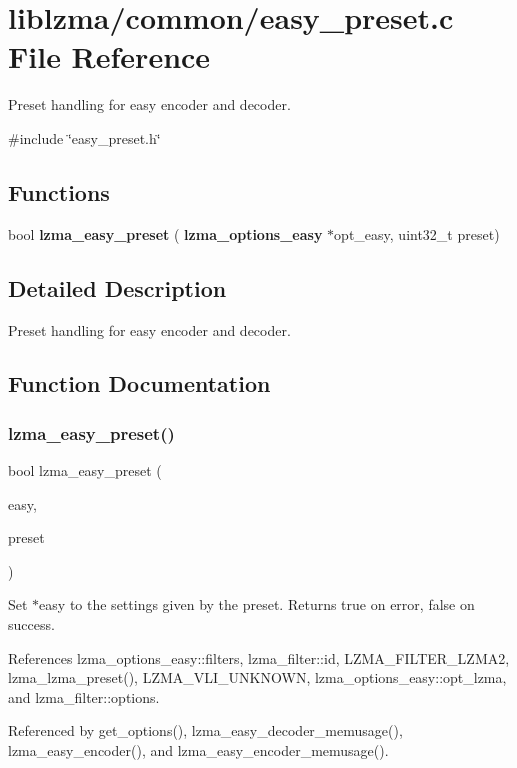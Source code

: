 \section{liblzma/common/easy\+\_\+preset.c File Reference}
\label{easy__preset_8c}


Preset handling for easy encoder and decoder.  


{\ttfamily \#include \char`\"{}easy\+\_\+preset.\+h\char`\"{}}\newline
\subsection*{Functions}
\begin{DoxyCompactItemize}
\item 
bool \textbf{ lzma\+\_\+easy\+\_\+preset} (\textbf{ lzma\+\_\+options\+\_\+easy} $\ast$opt\+\_\+easy, uint32\+\_\+t preset)
\end{DoxyCompactItemize}


\subsection{Detailed Description}
Preset handling for easy encoder and decoder. 



\subsection{Function Documentation}
\mbox{\label{easy__preset_8c_a995811b30166c539268d4c30d1e60b74}} 
\subsubsection{lzma\+\_\+easy\+\_\+preset()}
{\footnotesize\ttfamily bool lzma\+\_\+easy\+\_\+preset (\begin{DoxyParamCaption}\item[{\textbf{ lzma\+\_\+options\+\_\+easy} $\ast$}]{easy,  }\item[{uint32\+\_\+t}]{preset }\end{DoxyParamCaption})}

Set $\ast$easy to the settings given by the preset. Returns true on error, false on success. 

References lzma\+\_\+options\+\_\+easy\+::filters, lzma\+\_\+filter\+::id, L\+Z\+M\+A\+\_\+\+F\+I\+L\+T\+E\+R\+\_\+\+L\+Z\+M\+A2, lzma\+\_\+lzma\+\_\+preset(), L\+Z\+M\+A\+\_\+\+V\+L\+I\+\_\+\+U\+N\+K\+N\+O\+WN, lzma\+\_\+options\+\_\+easy\+::opt\+\_\+lzma, and lzma\+\_\+filter\+::options.



Referenced by get\+\_\+options(), lzma\+\_\+easy\+\_\+decoder\+\_\+memusage(), lzma\+\_\+easy\+\_\+encoder(), and lzma\+\_\+easy\+\_\+encoder\+\_\+memusage().

